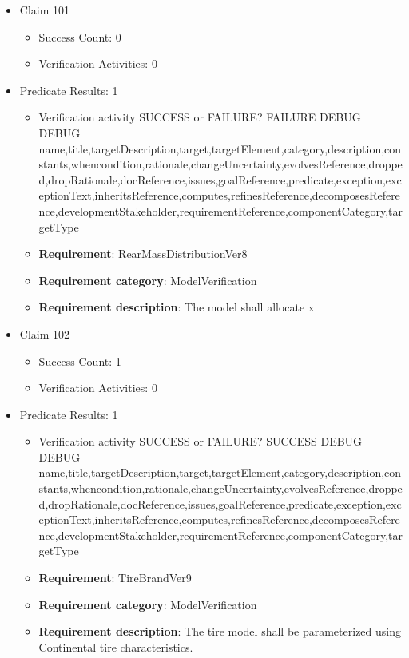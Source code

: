 \documentclass{article}
\begin{document}
\begin{itemize}
  				  \item Claim 101
				\begin{itemize}
			    	\item Success Count: 0 
			    	\item Verification Activities: 0
				\end{itemize}
				
									    
				\item Predicate Results: 1
					\begin{itemize}				
					\item Verification activity SUCCESS or FAILURE? FAILURE
					DEBUG DEBUG name,title,targetDescription,target,targetElement,category,description,constants,whencondition,rationale,changeUncertainty,evolvesReference,dropped,dropRationale,docReference,issues,goalReference,predicate,exception,exceptionText,inheritsReference,computes,refinesReference,decomposesReference,developmentStakeholder,requirementReference,componentCategory,targetType
					\item \textbf{Requirement}: RearMassDistributionVer8 
					\item \textbf{Requirement category}: ModelVerification
					\item \textbf{Requirement description}: The model shall allocate x%
					\end{itemize}

  				  \item Claim 102
				\begin{itemize}
			    	\item Success Count: 1 
			    	\item Verification Activities: 0
				\end{itemize}
				
									    
				\item Predicate Results: 1
					\begin{itemize}				
					\item Verification activity SUCCESS or FAILURE? SUCCESS
					DEBUG DEBUG name,title,targetDescription,target,targetElement,category,description,constants,whencondition,rationale,changeUncertainty,evolvesReference,dropped,dropRationale,docReference,issues,goalReference,predicate,exception,exceptionText,inheritsReference,computes,refinesReference,decomposesReference,developmentStakeholder,requirementReference,componentCategory,targetType
					\item \textbf{Requirement}: TireBrandVer9 
					\item \textbf{Requirement category}: ModelVerification
					\item \textbf{Requirement description}: The tire model shall be parameterized using Continental tire characteristics.
					\end{itemize}


\end{itemize}
\end{document}
